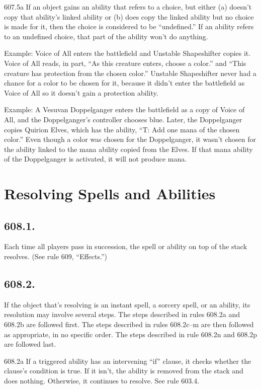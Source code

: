 607.5a If an object gains an ability that refers to a choice, but either (a) doesn’t copy that ability’s linked ability or (b) does copy the linked ability but no choice is made for it, then the choice is considered to be “undefined.” If an ability refers to an undefined choice, that part of the ability won’t do anything.

Example: Voice of All enters the battlefield and Unstable Shapeshifter copies it. Voice of All reads, in part, “As this creature enters, choose a color.” and “This creature has protection from the chosen color.” Unstable Shapeshifter never had a chance for a color to be chosen for it, because it didn’t enter the battlefield as Voice of All so it doesn’t gain a protection ability.

Example: A Vesuvan Doppelganger enters the battlefield as a copy of Voice of All, and the Doppelganger’s controller chooses blue. Later, the Doppelganger copies Quirion Elves, which has the ability, “{T}: Add one mana of the chosen color.” Even though a color was chosen for the Doppelganger, it wasn’t chosen for the ability linked to the mana ability copied from the Elves. If that mana ability of the Doppelganger is activated, it will not produce mana.

\section{Resolving Spells and Abilities}
\subsection*{608.1.}
Each time all players pass in succession, the spell or ability on top of the stack resolves. (See rule 609, “Effects.”)

\subsection*{608.2.}
If the object that’s resolving is an instant spell, a sorcery spell, or an ability, its resolution may involve several steps. The steps described in rules 608.2a and 608.2b are followed first. The steps described in rules 608.2c–m are then followed as appropriate, in no specific order. The steps described in rule 608.2n and 608.2p are followed last.

608.2a If a triggered ability has an intervening “if” clause, it checks whether the clause’s condition is true. If it isn’t, the ability is removed from the stack and does nothing. Otherwise, it continues to resolve. See rule 603.4.


